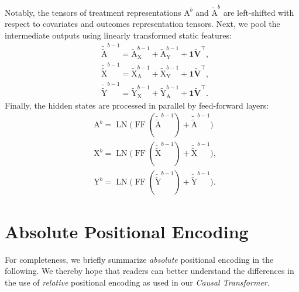 \documentclass{article}
\theoremstyle{plain}
\theoremstyle{definition}
\theoremstyle{remark}
\newcommand{\longname}{\emph{Causal Transformer}\xspace}
\begin{document}
Notably, the tensors of treatment representations $\mathrm{A}^{b}$ and $\tilde{\mathrm{A}}^{b}$ are left-shifted with respect to covariates and outcomes representation tensors. Next, we pool the intermediate outputs using linearly transformed static features:
\begin{align}
        & \tilde{\tilde{\mathrm{A}}}^{b - 1} = \tilde{\mathrm{A}}^{b - 1}_{\mathrm{X}} + \tilde{\mathrm{A}}^{b - 1}_{\mathrm{Y}} + \mathbf{1} \tilde{\mathbf{V}}^\top , \\
        & \tilde{\tilde{\mathrm{X}}}^{b - 1} = \tilde{\mathrm{X}}^{b - 1}_{\mathrm{A}} + \tilde{\mathrm{X}}^{b - 1}_{\mathrm{Y}} + \mathbf{1} \tilde{\mathbf{V}}^\top , \\
        & \tilde{\tilde{\mathrm{Y}}}^{b - 1} = \tilde{\mathrm{Y}}^{b - 1}_{\mathrm{X}} + \tilde{\mathrm{Y}}^{b - 1}_{\mathrm{A}} + \mathbf{1} \tilde{\mathbf{V}}^\top .
\end{align}
Finally, the hidden states are processed in parallel by feed-forward layers:
\begin{align}
        & \mathrm{A}^{b} = \operatorname{LN}\big(\operatorname{FF}(\tilde{\tilde{\mathrm{A}}}^{b - 1}) + \tilde{\tilde{\mathrm{A}}}^{b - 1}\big) \\
        & \mathrm{X}^{b} = \operatorname{LN}\big(\operatorname{FF}(\tilde{\tilde{\mathrm{X}}}^{b - 1}) + \tilde{\tilde{\mathrm{X}}}^{b - 1}\big) , \\
        & \mathrm{Y}^{b} = \operatorname{LN}\big(\operatorname{FF}(\tilde{\tilde{\mathrm{Y}}}^{b - 1}) + \tilde{\tilde{\mathrm{Y}}}^{b - 1}\big) .
\end{align}

\clearpage
\section{Absolute Positional Encoding} 
\label{app:abs-pe}

For completeness, we briefly summarize \emph{absolute} positional encoding \cite{vaswani2017attention} in the following. We thereby hope that readers can better understand the differences in the use of \emph{relative} positional encoding as used in our \longname.
\end{document}
